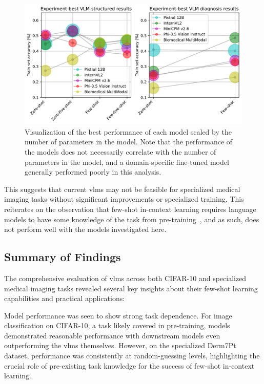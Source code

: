 \documentclass[../ShajiS_RnDReport.tex]{subfiles}
\begin{document}
\begin{figure}[ht]
    \centering
    \includegraphics[width=\linewidth]{figures/derm7pt_model_best_performance_over_model_parameter_count.pdf}
    \caption{Visualization of the best performance of each model scaled by the number of parameters in the model. Note that the performance of the models does not necessarily correlate with the number of parameters in the model, and a domain-specific fine-tuned model generally performed poorly in this analysis.}
    \label{fig:derm7pt_model_best_performance_over_model_parameter_count}
\end{figure}

This suggests that current \glspl{vlm} may not be feasible for specialized medical imaging tasks without significant improvements or specialized training. This reiterates on the observation that few-shot in-context learning requires language models to have some knowledge of the task from pre-training~\cite{Brown2020}, and as such, does not perform well with the models investigated here.

\subsection{Summary of Findings}
The comprehensive evaluation of \glspl{vlm} across both CIFAR-10 and specialized medical imaging tasks revealed several key insights about their few-shot learning capabilities and practical applications:

Model performance was seen to show strong task dependence. For image classification on CIFAR-10, a task likely covered in pre-training, models demonstrated reasonable performance with downstream models even outperforming the \glspl{vlm} themselves. However, on the specialized Derm7Pt dataset, performance was consistently at random-guessing levels, highlighting the crucial role of pre-existing task knowledge for the success of few-shot in-context learning.
\end{document}

